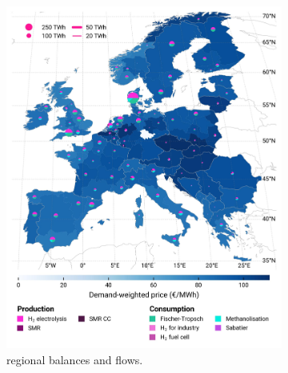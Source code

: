 \documentclass[preprint,12pt,sort&compress]{elsarticle}
\begin{document}
\begin{figure}[htbp]
  \centering
  \begin{subfigure}[t]{0.49\textwidth}
      \vspace{0pt}
      \includegraphics[width=1\textwidth]{maps/no-pipelines-no-pcipmi/base_s_adm___2050-balance_map_H2}
      \vspace{-0.5cm}
      \caption{ regional balances and flows.}
      \label{fig:DI_lt_2050_h2}
  \end{subfigure}
  \hfill
  \begin{subfigure}[t]{0.49\textwidth}
      \vspace{0pt}

\end{subfigure}
\end{figure}
\end{document}
